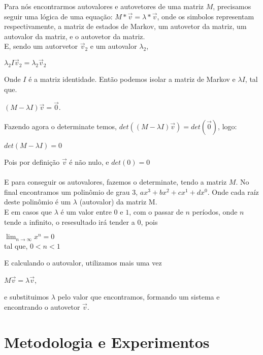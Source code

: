 \documentclass[a4paper,12pt]{article}
\begin{document}
    Para nós encontrarmos autovalores e autovetores de uma matriz $M$, precisamos seguir uma lógica de uma equação:
$M * \vec{v} = \lambda * \vec{v}$,
onde os simbolos representam respectivamente, a matriz de estados de Markov, um autovetor da matriz, um autovalor da matriz, e o autovetor da matriz. \\

    E, sendo um autorvetor $\vec{v}_2$ e um autovalor $\lambda_2$,
\begin{center}
$\lambda_2 I \vec{v}_2 = \lambda_2 \vec{v}_2$
\end{center}

    Onde $I$ é a matriz identidade.
Então podemos isolar a matriz de Markov e $\lambda I$, tal que.

\begin{center}
$(M-\lambda I)\vec{v} = \vec{0}$.\end{center}

Fazendo agora o determinate temos, 
$det((M-\lambda I)\vec{v}) = det(\vec{0})$, logo:

\begin{center}
    $det(M - \lambda I) = 0$
\end{center}

Pois por definição $\vec{v}$ é não nulo, e $det(0) = 0$\\\\
E para conseguir os autovalores, fazemos o determinate, tendo a matriz $M$. No final encontramos um polinômio de grau 3,  $ax^3 + bx^2 + cx^1 + dx^0$. Onde cada raíz deste polinômio é um $\lambda$ (autovalor) da matriz M.\\

E em casos que $\lambda$ é um valor entre $0$ e $1$, com o passar de $n$ períodos, onde $n$ tende a infinito, o resesultado irá tender a $0$, pois\\
\begin{center}
$\lim_{n\to\infty} x^n = 0$\\ tal que,  $0 < n < 1$\end{center}

E calculando o autovalor, utilizamos mais uma vez\\
\begin{center}
    $M \vec{v} = \lambda \vec{v}$,
\end{center}
e substituimos $\lambda$ pelo valor que encontramos, formando um sistema e encontrando o autovetor $\vec{v}$.

\section{Metodologia e Experimentos}
\label{sec:metodologia}
\end{document}
